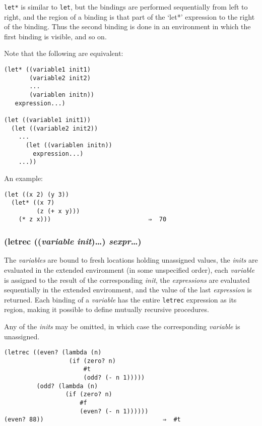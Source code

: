 \documentclass{article}
\begin{document}
\verb|let*| is similar to \verb|let|, but the bindings are performed sequentially from left to
right, and the region of a binding is that part of the `let*' expression to the right of the
binding. Thus the second binding is done in an environment in which the first binding is
visible, and so on.

Note that the following are equivalent:

\begin{verbatim}
(let* ((variable1 init1)
       (variable2 init2)
       ...
       (variablen initn))
   expression...)

(let ((variable1 init1))
  (let ((variable2 init2))
    ...
      (let ((variablen initn))
        expression...)
    ...))
\end{verbatim}

An example:

\begin{verbatim}
(let ((x 2) (y 3))
  (let* ((x 7)
         (z (+ x y)))
    (* z x)))                           ⇒  70
\end{verbatim}

\subsubsection{(letrec ((\emph{variable} \emph{init})\ldots{}) \emph{sexpr}\ldots{})}

The \emph{variables} are bound to fresh locations holding unassigned values, the \emph{inits}
are evaluated in the extended environment (in some unspecified order), each \emph{variable} is
assigned to the result of the corresponding \emph{init}, the \emph{expressions} are evaluated
sequentially in the extended environment, and the value of the last \emph{expression} is
returned. Each binding of a \emph{variable} has the entire \verb|letrec| expression as its
region, making it possible to define mutually recursive procedures.

Any of the \emph{inits} may be omitted, in which case the corresponding \emph{variable} is
unassigned.

\begin{verbatim}
(letrec ((even? (lambda (n)
                  (if (zero? n)
                      #t
                      (odd? (- n 1)))))
         (odd? (lambda (n)
                 (if (zero? n)
                     #f
                     (even? (- n 1))))))
(even? 88))                                 ⇒  #t
\end{verbatim}
\end{document}
